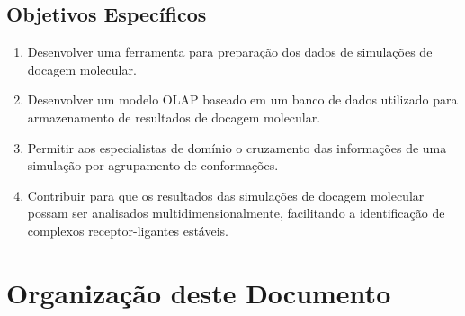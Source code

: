\subsection{Objetivos Específicos}
\begin{enumerate}
	\item Desenvolver uma ferramenta para preparação dos dados de simulações de docagem molecular.
	\item Desenvolver um modelo OLAP baseado em um banco de dados utilizado para armazenamento de resultados de docagem molecular.
	\item Permitir aos especialistas de domínio o cruzamento das informações de uma simulação por agrupamento de conformações.
	\item Contribuir para que os resultados das simulações de docagem molecular possam ser analisados multidimensionalmente, facilitando a identificação de complexos receptor-ligantes estáveis.
\end{enumerate}

\section{Organização deste Documento}